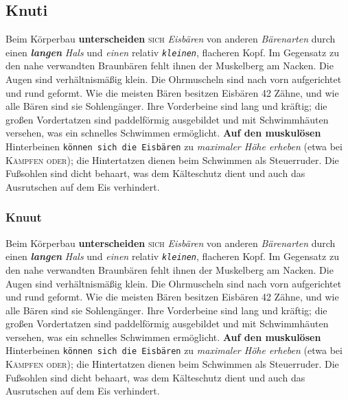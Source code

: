 \documentclass{article}
\begin{document}
\subsection{Knuti}
\blindtext

Beim Körperbau \textbf{unterscheiden} \textsc{sich} \emph{Eisbären}
von \textsf{anderen} \textit{Bärenarten} durch einen
\textbf{\textit{langen}} \textsl{\textit{Hals}} und
\textsf{\textit{einen}} relativ \texttt{\textit{kleinen}}, {\Huge
  flacheren} {\tiny Kopf}. Im {\LARGE Gegensatz} zu den nahe
verwandten Braunbären fehlt ihnen der Muskelberg am Nacken. Die Augen
sind verhältnismäßig klein. Die Ohrmuscheln sind nach vorn
aufgerichtet und rund geformt. Wie die meisten Bären besitzen Eisbären
42 Zähne, und wie alle Bären sind sie Sohlengänger. Ihre Vorderbeine
sind lang und kräftig; die großen Vordertatzen sind paddelförmig
ausgebildet und mit Schwimmhäuten versehen, was ein schnelles
Schwimmen ermöglicht. \textbf{\Huge Auf den muskulösen} Hinterbeinen
\texttt{\tiny können sich die Eisbären} zu \textit{\LARGE maximaler Höhe erheben} (etwa
bei \textsc{\huge Kämpfen oder}); die Hintertatzen
dienen beim Schwimmen als Steuerruder. Die Fußsohlen sind dicht
behaart, was dem Kälteschutz dient und auch das Ausrutschen auf dem
Eis verhindert. 
\subsubsection{Knuut}
\blindtext

Beim Körperbau \textbf{unterscheiden} \textsc{sich} \emph{Eisbären}
von \textsf{anderen} \textit{Bärenarten} durch einen
\textbf{\textit{langen}} \textsl{\textit{Hals}} und
\textsf{\textit{einen}} relativ \texttt{\textit{kleinen}}, {\Huge
  flacheren} {\tiny Kopf}. Im {\LARGE Gegensatz} zu den nahe
verwandten Braunbären fehlt ihnen der Muskelberg am Nacken. Die Augen
sind verhältnismäßig klein. Die Ohrmuscheln sind nach vorn
aufgerichtet und rund geformt. Wie die meisten Bären besitzen Eisbären
42 Zähne, und wie alle Bären sind sie Sohlengänger. Ihre Vorderbeine
sind lang und kräftig; die großen Vordertatzen sind paddelförmig
ausgebildet und mit Schwimmhäuten versehen, was ein schnelles
Schwimmen ermöglicht. \textbf{\Huge Auf den muskulösen} Hinterbeinen
\texttt{\tiny können sich die Eisbären} zu \textit{\LARGE maximaler Höhe erheben} (etwa
bei \textsc{\huge Kämpfen oder}); die Hintertatzen
dienen beim Schwimmen als Steuerruder. Die Fußsohlen sind dicht
behaart, was dem Kälteschutz dient und auch das Ausrutschen auf dem
Eis verhindert. 
\end{document}
